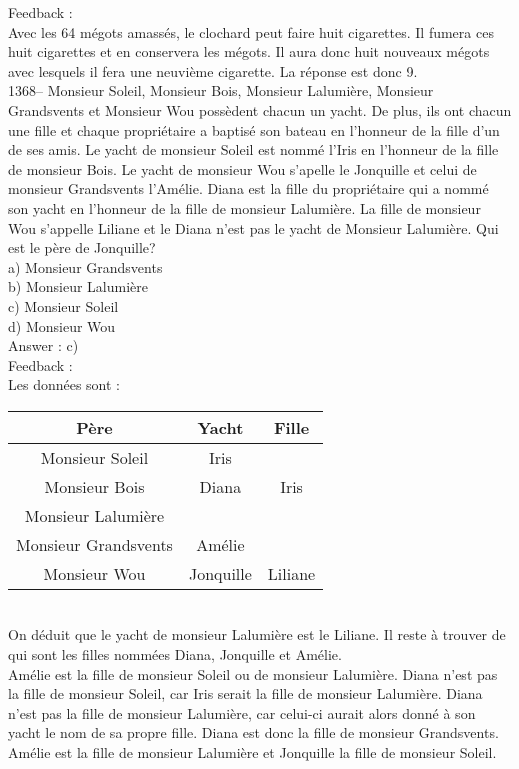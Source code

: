 ﻿\documentclass[letterpaper, 12pt]{article}
\begin{document}
Feedback : \\
Avec les 64 m\'egots amass\'es, le clochard peut faire huit cigarettes.  Il
fumera ces huit cigarettes et en conservera les m\'egots.  Il aura donc huit
nouveaux m\'egots avec lesquels il fera une neuvi\`eme cigarette.  La
r\'eponse est donc 9.\\

1368-- Monsieur Soleil, Monsieur Bois, Monsieur Lalumi\`ere, Monsieur
Grandsvents et Monsieur Wou poss\`edent chacun un yacht.  De plus, ils ont
chacun une fille et chaque propri\'etaire a baptis\'e son bateau en
l'honneur de la fille d'un de ses amis.  Le yacht de monsieur Soleil est
nomm\'e l'Iris en l'honneur de la fille de monsieur Bois.  Le yacht de
monsieur Wou s'apelle le Jonquille et celui de monsieur Grandsvents
l'Am\'elie.  Diana est la fille du propri\'etaire qui a nomm\'e son yacht en
l'honneur de la fille de monsieur Lalumi\`ere.  La fille de monsieur Wou
s'appelle Liliane et le Diana n'est pas le yacht de Monsieur Lalumi\`ere.
Qui est le p\`ere de Jonquille?\\
a) Monsieur Grandsvents\\
b) Monsieur Lalumi\`ere\\
c) Monsieur Soleil\\
d) Monsieur Wou\\

Answer : c)\\

Feedback : \\
Les donn\'ees sont : \\
\begin{tabular}{|c|c|c|} \hline
{\bf P\`ere} & {\bf Yacht} & {\bf Fille}  \\ \hline \hline

Monsieur Soleil        & Iris      &  \\ \hline Monsieur Bois &
Diana     &  Iris\\ \hline Monsieur Lalumi\`ere   &           &
\\ \hline Monsieur Grandsvents   & Am\'elie  &  \\ \hline Monsieur
Wou           & Jonquille &  Liliane\\ \hline

\end{tabular}\\

On d\'eduit que le yacht de monsieur Lalumi\`ere est le Liliane.  Il reste
\`a trouver de qui sont les filles nomm\'ees Diana, Jonquille et Am\'elie.
\\
Am\'elie est la fille de monsieur Soleil ou de monsieur Lalumi\`ere.  Diana
n'est pas la fille de monsieur Soleil, car Iris serait la fille de monsieur
Lalumi\`ere.  Diana n'est pas la fille de monsieur Lalumi\`ere, car celui-ci
aurait alors donn\'e \`a son yacht le nom de sa propre fille.  Diana est
donc la fille de monsieur Grandsvents.  Am\'elie est la fille de monsieur
Lalumi\`ere et Jonquille la fille de monsieur Soleil.  \\
\end{document}
